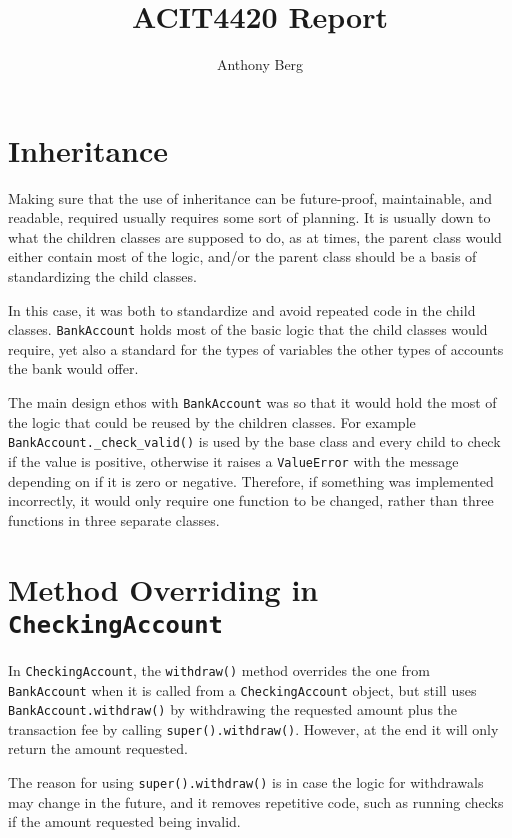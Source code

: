 \documentclass[11pt,british]{article}
\author{Anthony Berg}
\title{ACIT4420 Report}
\begin{document}
\maketitle

\section*{Inheritance}

Making sure that the use of inheritance can be future-proof, maintainable, and readable,
required usually requires some sort of planning.
It is usually down to what the children
classes are supposed to do, as at times, the parent class would either contain most of
the logic, and\slash or the parent class should be a basis of standardizing the child classes.

In this case, it was both to standardize and avoid repeated code in the child classes.
\Verb|BankAccount| holds most of the basic logic that the child classes would require,
yet also a standard for the types of variables the other types of accounts the bank would offer.

The main design ethos with \Verb|BankAccount| was so that it would hold the most of
the logic that could be reused by the children classes.
For example \Verb|BankAccount._check_valid()| is used by the base class and every child
to check if the value is positive, otherwise it raises a \Verb|ValueError| with the
message depending on if it is zero or negative.
Therefore, if something was implemented incorrectly, it would only require one function
to be changed, rather than three functions in three separate classes.

\section*{Method Overriding in \Verb|CheckingAccount|}

In \Verb|CheckingAccount|, the \Verb|withdraw()| method overrides the one from
\Verb|BankAccount| when it is called from a \Verb|CheckingAccount| object, but
still uses \Verb|BankAccount.withdraw()| by withdrawing the requested amount
plus the transaction fee by calling \Verb|super().withdraw()|. However, at the end
it will only return the amount requested.

The reason for using \Verb|super().withdraw()| is in case the logic for withdrawals
may change in the future, and it removes repetitive code, such as running checks
if the amount requested being invalid.
\end{document}
